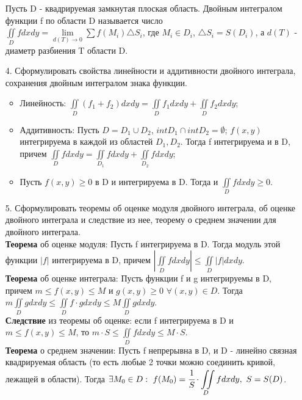 \documentclass[a4paper]{article}
\begin{document}
\begin{enumerate}
Пусть D - квадрируемая замкнутая плоская область. Двойным интегралом функции f по области D называется число $\displaystyle  \iint\limits_{D} f dxdy = \lim\limits_{d(T) \to 0} \sum f(M_i) \triangle S_i$, где $M_i \in D_i$, $\triangle S_i = S(D_i)$, а $d(T)$ - диаметр разбиения T области D. \\


\item[4.] Сформулировать свойства линейности и аддитивности двойного интеграла, сохранения двойным интегралом знака функции. \\

\begin{itemize}
\item Линейность: $\displaystyle  \iint\limits_{D} (f_1 + f_2) dxdy = \iint\limits_{D} f_1 dxdy + \iint\limits_{D} f_2 dxdy$;
\item Аддитивность: Пусть $D = D_1 \cup D_2$, $int D_1 \cap int D_2 = \emptyset$; $f(x,y)$ интегрируема в каждой из областей $D_1, D_2$. Тогда f интегрируема и в D, причем $\displaystyle  \iint\limits_{D} f dxdy = \iint\limits_{D_1} f dxdy + \iint\limits_{D_2} f dxdy$;
\item Пусть $f(x,y) \geqslant 0$ в D и интегрируема в D. Тогда и $\displaystyle  \iint\limits_{D} f dxdy \geqslant 0$.
\end{itemize}



\item[5.] Сформулировать теоремы об оценке модуля двойного интеграла, об оценке двойного интеграла и следствие из нее, теорему о среднем значении для двойного интеграла. \\

\textbf{Теорема} об оценке модуля: Пусть f интегрируема в D. Тогда модуль этой функции $|f|$ интегрируема в D, причем $\displaystyle  \left| \iint\limits_{D} f dxdy \right| \leqslant \iint\limits_{D} |f| dxdy$. \\
\textbf{Теорема} об оценке интеграла: Пусть функции f и g интегрируемы в D, причем $m \leqslant f(x,y) \leqslant M$ и $g(x,y) \geqslant 0$ $\forall (x,y) \in D$. Тогда $\displaystyle  m \iint\limits_{D} g dxdy \leqslant \iint\limits_{D} f \cdot g dxdy \leqslant M \iint\limits_{D} g dxdy$. \\
\textbf{Следствие} из теоремы об оценке: если f интегрируема в D и $m \leqslant f(x,y) \leqslant M$, то $\displaystyle  m \cdot S \leqslant \iint\limits_D f dxdy \leqslant M \cdot S$. \\
\textbf{Теорема} о среднем значении: Пусть f непрерывна в D, и D - линейно связная квадрируемая область (то есть любые 2 точки можно соединить кривой, лежащей в области). Тогда $\displaystyle  \exists M_0 \in D: \ f(M_0) = \cfrac{1}{S} \cdot \iint\limits_D f dxdy, \ S = S(D)$. \\ %



\end{enumerate}
\end{document}
